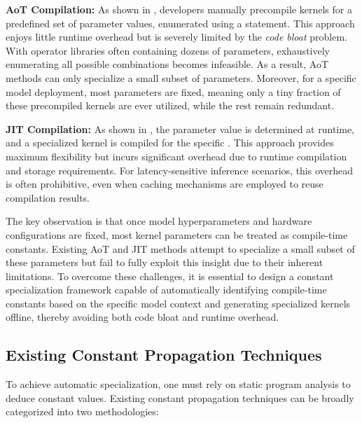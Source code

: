\textbf{AoT Compilation:} As shown in , developers manually precompile kernels for a predefined set of parameter values, enumerated using a  statement. 
This approach enjoys little runtime overhead but is severely limited by the \textit{code bloat} problem. 
With operator libraries often containing dozens of parameters, exhaustively enumerating all possible combinations becomes infeasible.
As a result, AoT methods can only specialize a small subset of parameters.
Moreover, for a specific model deployment, most parameters are fixed, meaning only a tiny fraction of these precompiled kernels are ever utilized, while the rest remain redundant.

\textbf{JIT Compilation:} As shown in , the parameter value  is determined at runtime, and a specialized kernel  is compiled for the specific . 
This approach provides maximum flexibility but incurs significant overhead due to runtime compilation and storage requirements. 
For latency-sensitive inference scenarios, this overhead is often prohibitive, even when caching mechanisms are employed to reuse compilation results.

The key observation is that once model hyperparameters and hardware configurations are fixed, most kernel parameters can be treated as compile-time constants. 
Existing AoT and JIT methods attempt to specialize a small subset of these parameters but fail to fully exploit this insight due to their inherent limitations. 
To overcome these challenges, it is essential to design a constant specialization framework capable of automatically identifying compile-time constants based on the specific model context and generating specialized kernels offline, thereby avoiding both code bloat and runtime overhead.

\subsection{Existing Constant Propagation Techniques}

To achieve automatic specialization, one must rely on static program analysis to deduce constant values. Existing constant propagation techniques can be broadly categorized into two methodologies:

